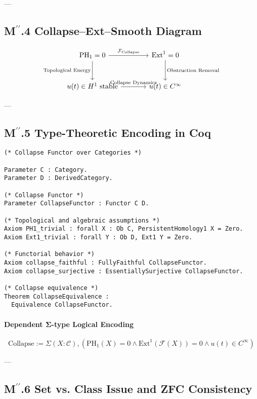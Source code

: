 \documentclass[11pt]{article}
\begin{document}
\begin{axiom}
\begin{axiom}
{{---

\subsection*{M$^{\prime\prime}$.4 Collapse–Ext–Smooth Diagram}

\[
\begin{tikzcd}[row sep=large, column sep=large]
\mathrm{PH}_1 = 0 \arrow[r, "\mathcal{F}_{\text{Collapse}}"] \arrow[d, "\text{Topological Energy}"']
& \mathrm{Ext}^1 = 0 \arrow[d, "\text{Obstruction Removal}"] \\
u(t) \in H^1 \text{ stable} \arrow[r, "\text{Collapse Dynamics}"]
& u(t) \in C^\infty
\end{tikzcd}
\]

---

\subsection*{M$^{\prime\prime}$.5 Type-Theoretic Encoding in Coq}

\begin{lstlisting}[language=Coq, caption=Collapse Functor in Coq Type Theory]
(* Collapse Functor over Categories *)

Parameter C : Category.
Parameter D : DerivedCategory.

(* Collapse Functor *)
Parameter CollapseFunctor : Functor C D.

(* Topological and algebraic assumptions *)
Axiom PH1_trivial : forall X : Ob C, PersistentHomology1 X = Zero.
Axiom Ext1_trivial : forall Y : Ob D, Ext1 Y = Zero.

(* Functorial behavior *)
Axiom collapse_faithful : FullyFaithful CollapseFunctor.
Axiom collapse_surjective : EssentiallySurjective CollapseFunctor.

(* Collapse equivalence *)
Theorem CollapseEquivalence :
  Equivalence CollapseFunctor.
\end{lstlisting}

\paragraph{Dependent Σ-type Logical Encoding}

\[
\text{Collapse} := \Sigma (X : \mathcal{C}),  
\left( \mathrm{PH}_1(X) = 0 \wedge \mathrm{Ext}^1(\mathcal{F}(X)) = 0 \wedge u(t) \in C^\infty \right)
\]

---

\subsection*{M$^{\prime\prime}$.6 Set vs. Class Issue and ZFC Consistency}

}}
\end{axiom}
\end{axiom}
\end{document}
